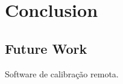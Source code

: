 
\chapter{Conclusion}
\label{chapter:conclusion}

\section{Future Work}
\label{sec:future_work}
Software de calibração remota.
